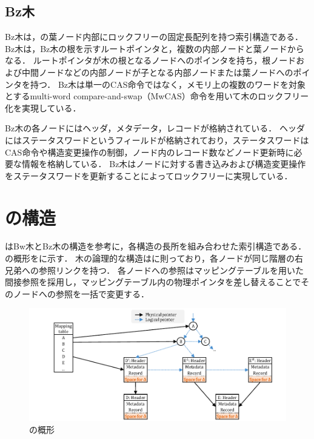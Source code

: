 \subsection{Bz木}

Bz木は，\Bptree{}の葉ノード内部にロックフリーの固定長配列を持つ索引構造である．
Bz木は，Bz木の根を示すルートポインタと，複数の内部ノードと葉ノードからなる．
ルートポインタが木の根となるノードへのポインタを持ち，根ノードおよび中間ノードなどの内部ノードが子となる内部ノードまたは葉ノードへのポインタを持つ．
Bz木は単一のCAS命令ではなく，メモリ上の複数のワードを対象とするmulti-word compare-and-swap（MwCAS）命令を用いて木のロックフリー化を実現している．

Bz木の各ノードにはヘッダ，メタデータ，レコードが格納されている．
ヘッダにはステータスワードというフィールドが格納されており，ステータスワードはCAS命令や構造変更操作の制御，ノード内のレコード数などノード更新時に必要な情報を格納している．
Bz木はノードに対する書き込みおよび構造変更操作をステータスワードを更新することによってロックフリーに実現している．

\section{\Bctree{}の構造}
\label{sec:bc_tree_structure}

\Bctree{}はBw木とBz木の構造を参考に，各構造の長所を組み合わせた索引構造である．
\Bctree{}の概形を\Fig{\ref{fig:bc_tree-structure}}に示す．
木の論理的な構造は\Blinktree{}に則っており，各ノードが同じ階層の右兄弟への参照リンクを持つ．
各ノードへの参照はマッピングテーブルを用いた間接参照を採用し，マッピングテーブル内の物理ポインタを差し替えることでそのノードへの参照を一括で変更する．

\begin{figure}[t]
    \centering
    \includegraphics{./figures/Bc-structure.pdf}
    \caption{\Bctree{}の概形}
    \label{fig:bc_tree-structure}
\end{figure}

